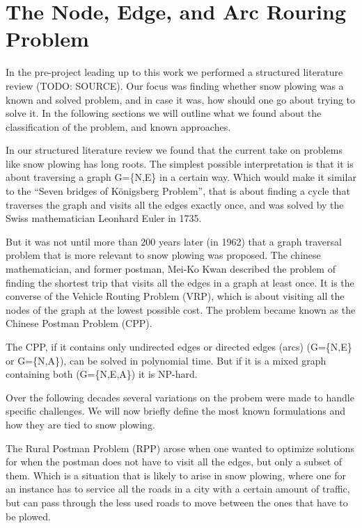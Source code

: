

\section{The Node, Edge, and Arc Rouring Problem}
\label{the_nearp}

In the pre-project leading up to this work we performed a structured literature review (TODO: SOURCE). Our focus was finding whether snow plowing was a known and solved problem, and in case it was, how should one go about trying to solve it. In the following sections we will outline what we found about the classification of the problem, and known approaches.

In our structured literature review we found that the current take on problems like snow plowing has long roots. The simplest possible interpretation is that it is about traversing a graph G=\{N,E\} in a certain way. Which would make it similar to the “Seven bridges of Königsberg Problem”, that is about finding a cycle that traverses the graph and visits all the edges exactly once, and was solved by the Swiss mathematician Leonhard Euler in 1735.

But it was not until more than 200 years later (in 1962) that a graph traversal problem that is more relevant to snow plowing was proposed. The chinese mathematician, and former postman, Mei-Ko Kwan described the problem of finding the shortest trip that visits all the edges in a graph at least once. It is the converse of the Vehicle Routing Problem (VRP), which is about visiting all the nodes of the graph at the lowest possible cost. The problem became known as the Chinese Postman Problem (CPP).

The CPP, if it contains only undirected edges or directed edges (arcs) (G=\{N,E\} or G=\{N,A\}), can be solved in polynomial time. But if it is a mixed graph containing both (G=\{N,E,A\}) it is NP-hard.

Over the following decades several variations on the probem were made to handle specific challenges. We will now briefly define the most known formulations and how they are tied to snow plowing.

The Rural Postman Problem (RPP) arose when one wanted to optimize solutions for when the postman does not have to visit all the edges, but only a subset of them. Which is a situation that is likely to arise in snow plowing, where one for an instance has to service all the roads in a city with a certain amount of traffic, but can pass through the less used roads to move between the ones that have to be plowed.

